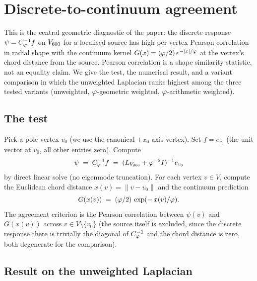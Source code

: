 \section{Discrete-to-continuum agreement}\label{sec:agreement}

This is the central geometric diagnostic of the paper: the
discrete response $\psi = C_{\varphi}^{-1} f$ on $V_{600}$ for a
localised source has high per-vertex Pearson correlation in radial
shape with the continuum kernel
$G(x) = (\varphi/2)\,e^{-|x|/\varphi}$ at the vertex's chord distance from
the source. Pearson correlation is a shape similarity statistic, not
an equality claim. We give the test, the numerical result, and a variant
comparison in which the unweighted Laplacian ranks highest among
the three tested variants (unweighted, $\varphi$-geometric weighted,
$\varphi$-arithmetic weighted).

\subsection{The test}\label{ssec:test}

Pick a pole vertex $v_{0}$ (we use the canonical $+x_{0}$ axis
vertex). Set $f = e_{v_{0}}$ (the unit vector at $v_{0}$, all
other entries zero). Compute
\[
\psi \;=\; C_{\varphi}^{-1} f \;=\; (L_{V_{600}} + \varphi^{-2} I)^{-1} e_{v_{0}}
\]
by direct linear solve (no eigenmode truncation). For each vertex
$v \in V$, compute the Euclidean chord distance
$x(v) = \|v - v_{0}\|$ and the continuum prediction
\[
G(x(v)) \;=\; (\varphi/2)\,\exp(-\,x(v)/\varphi).
\]
The agreement criterion is the Pearson correlation between
$\psi(v)$ and $G(x(v))$ across $v \in V \setminus \{v_{0}\}$ (the
source itself is excluded, since the discrete response there is
trivially the diagonal of $C_{\varphi}^{-1}$ and the chord distance is
zero, both degenerate for the comparison).

\subsection{Result on the unweighted Laplacian}\label{ssec:result_unweighted}

